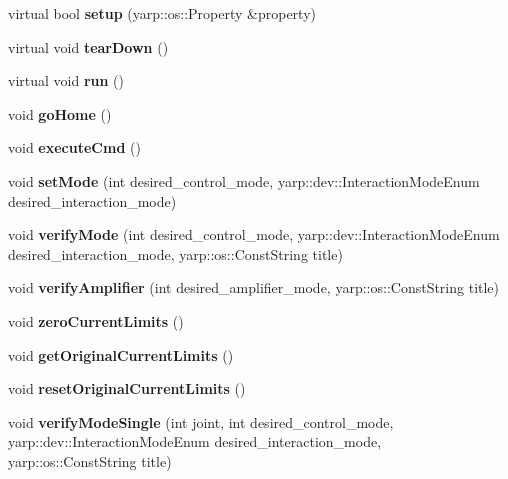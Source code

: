 \begin{DoxyCompactItemize}
\item 
virtual bool {\bfseries setup} (yarp\-::os\-::\-Property \&property)\label{classControlModes_a906098cdeee49ee608ec27e14d17fe4a}

\item 
virtual void {\bfseries tear\-Down} ()\label{classControlModes_a96e49aa347dc1a743e5f506672f72dc5}

\item 
virtual void {\bfseries run} ()\label{classControlModes_ae438acaf6677471f962d3d6eec430b52}

\item 
void {\bfseries go\-Home} ()\label{classControlModes_aba99419a0f329ef8db34b3247c9e8461}

\item 
void {\bfseries execute\-Cmd} ()\label{classControlModes_a499fb7c42dc501895e41fb8e7922f3fb}

\item 
void {\bfseries set\-Mode} (int desired\-\_\-control\-\_\-mode, yarp\-::dev\-::\-Interaction\-Mode\-Enum desired\-\_\-interaction\-\_\-mode)\label{classControlModes_a2db54b3f482b49317a73caffba85fe98}

\item 
void {\bfseries verify\-Mode} (int desired\-\_\-control\-\_\-mode, yarp\-::dev\-::\-Interaction\-Mode\-Enum desired\-\_\-interaction\-\_\-mode, yarp\-::os\-::\-Const\-String title)\label{classControlModes_a79dc3f6647b41b2b1047e0fb769930db}

\item 
void {\bfseries verify\-Amplifier} (int desired\-\_\-amplifier\-\_\-mode, yarp\-::os\-::\-Const\-String title)\label{classControlModes_ac4b07380ed5ef4d060320db5e27cefd5}

\item 
void {\bfseries zero\-Current\-Limits} ()\label{classControlModes_af8d034ed81bad265bef55868c93dccbb}

\item 
void {\bfseries get\-Original\-Current\-Limits} ()\label{classControlModes_a07b40de5590b6de6465275f120cc0278}

\item 
void {\bfseries reset\-Original\-Current\-Limits} ()\label{classControlModes_a4829a8e1d1d0a9bc97d6f99a39f200fb}

\item 
void {\bfseries verify\-Mode\-Single} (int joint, int desired\-\_\-control\-\_\-mode, yarp\-::dev\-::\-Interaction\-Mode\-Enum desired\-\_\-interaction\-\_\-mode, yarp\-::os\-::\-Const\-String title)\label{classControlModes_a484beacf0d13cdea8a6e2f42886a151e}


\end{DoxyCompactItemize}
